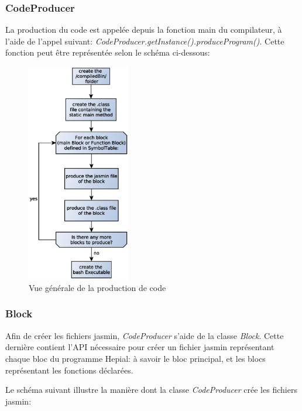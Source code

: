 \documentclass[11pt,a4paper]{article}
\begin{document}
  \subsubsection{CodeProducer}
  
  \par La production du code est appelée depuis la fonction main du compilateur, à l'aide de l'appel suivant: \textit{CodeProducer.getInstance().produceProgram()}. Cette fonction peut être représentée selon le schéma ci-dessous: 
  
  \begin{figure}[h]
    \includegraphics[width=0.4\textwidth,center]{../ressources/CodeProductionOverview.eps}
    \caption{Vue générale de la production de code}
  \end{figure}
  
  \subsubsection{Block}  
  
  \par Afin de créer les fichiers jasmin, \textit{CodeProducer} s'aide de la classe \textit{Block}. Cette dernière contient l'API nécessaire pour créer un fichier jasmin représentant chaque bloc du programme Hepial: à savoir le bloc principal, et les blocs représentant les fonctions déclarées. 
  
  \par Le schéma suivant illustre la manière dont la classe \textit{CodeProducer} crée les fichiers jasmin: 
  
\end{document}
